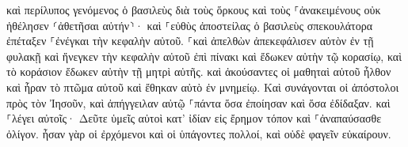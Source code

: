 \documentclass{openreader}
\begin{document}
καὶ περίλυπος γενόμενος ὁ βασιλεὺς διὰ τοὺς ὅρκους καὶ τοὺς ⸀ἀνακειμένους οὐκ ἠθέλησεν ⸂ἀθετῆσαι αὐτήν⸃· 
καὶ ⸀εὐθὺς ἀποστείλας ὁ βασιλεὺς σπεκουλάτορα ἐπέταξεν ⸀ἐνέγκαι τὴν κεφαλὴν αὐτοῦ. ⸀καὶ ἀπελθὼν ἀπεκεφάλισεν αὐτὸν ἐν τῇ φυλακῇ 
καὶ ἤνεγκεν τὴν κεφαλὴν αὐτοῦ ἐπὶ πίνακι καὶ ἔδωκεν αὐτὴν τῷ κορασίῳ, καὶ τὸ κοράσιον ἔδωκεν αὐτὴν τῇ μητρὶ αὐτῆς. 
καὶ ἀκούσαντες οἱ μαθηταὶ αὐτοῦ ἦλθον καὶ ἦραν τὸ πτῶμα αὐτοῦ καὶ ἔθηκαν αὐτὸ ἐν μνημείῳ. 
Καὶ συνάγονται οἱ ἀπόστολοι πρὸς τὸν Ἰησοῦν, καὶ ἀπήγγειλαν αὐτῷ ⸀πάντα ὅσα ἐποίησαν καὶ ὅσα ἐδίδαξαν. 
καὶ ⸀λέγει αὐτοῖς· Δεῦτε ὑμεῖς αὐτοὶ κατ’ ἰδίαν εἰς ἔρημον τόπον καὶ ⸀ἀναπαύσασθε ὀλίγον. ἦσαν γὰρ οἱ ἐρχόμενοι καὶ οἱ ὑπάγοντες πολλοί, καὶ οὐδὲ φαγεῖν εὐκαίρουν. 
\end{document}
